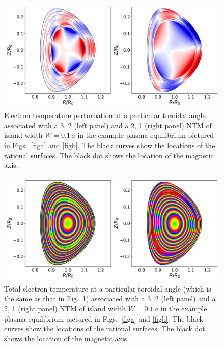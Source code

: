 \documentclass[12pt,prb,aps]{revtex4-1}
\begin{document}
\begin{figure}
\centerline{\includegraphics[width=\textwidth]{Fig13.png}}
\caption{Electron temperature perturbation at a particular toroidal angle associated with a 3, 2 (left panel) and a 2, 1 (right panel) NTM of island width $W=0.1\,a$ in the example plasma equilibrium pictured in Figs.~\ref{figa}
and \ref{figb}. The black curves show the locations of the rational surfaces. The black dot shows the location of the magnetic axis.\label{fig11}}
\end{figure}

\begin{figure}
\centerline{\includegraphics[width=\textwidth]{Fig14.png}}
\caption{Total electron temperature  at a particular toroidal angle (which is the same as that in Fig.~\ref{fig11}) associated with a 3, 2 (left panel) and a 2, 1 (right panel) NTM of island width $W=0.1\,a$  in the example plasma equilibrium pictured in Figs.~\ref{figa}
and \ref{figb}. The black curves show the locations of the rational surfaces. The black dot shows the location of the magnetic axis.\label{fig12}}
\end{figure}
\end{document}
